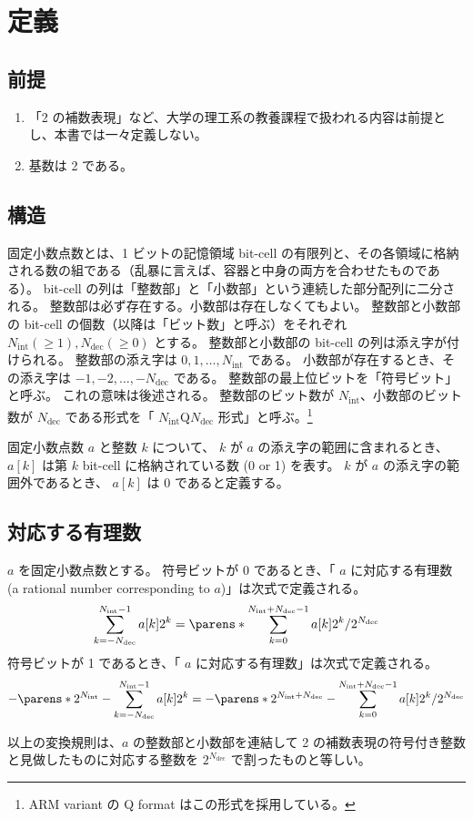\chapter{定義}
    \newcommand{\Ni}{{N_\text{int}}}
    \newcommand{\Nd}{{N_\text{dec}}}
    \section{前提}
        \label{fxd-pt_num::def::prem}
        \begin{enumerate}
            \item 「2 の補数表現」など、大学の理工系の教養課程で扱われる内容は前提とし、本書では一々定義しない。
            \item 基数は 2 である。
        \end{enumerate}
    \section{構造}
        固定小数点数とは、1 ビットの記憶領域 bit-cell の有限列と、その各領域に格納される数の組である（乱暴に言えば、容器と中身の両方を合わせたものである）。
        bit-cell の列は「整数部」と「小数部」という連続した部分配列に二分される。
        整数部は必ず存在する。小数部は存在しなくてもよい。
        整数部と小数部の bit-cell の個数（以降は「ビット数」と呼ぶ）をそれぞれ $\Ni(\geq 1), \Nd(\geq 0)$ とする。
        整数部と小数部の bit-cell の列は添え字が付けられる。
        整数部の添え字は $0,1,\dots,\Ni$ である。
        小数部が存在するとき、その添え字は $-1,-2,\dots,-\Nd$ である。
        整数部の最上位ビットを「符号ビット」と呼ぶ。
        これの意味は後述される。
        整数部のビット数が $\Ni$、小数部のビット数が $\Nd$ である形式を「 $\Ni$Q$\Nd$ 形式」と呼ぶ。\footnote{ARM variant の Q format はこの形式を採用している。}
        \par
        固定小数点数 $a$ と整数 $k$ について、 $k$ が $a$ の添え字の範囲に含まれるとき、$a[k]$ は第 $k$ bit-cell に格納されている数 (0 or 1) を表す。
        $k$ が $a$ の添え字の範囲外であるとき、 $a[k]$ は 0 であると定義する。
    \section{対応する有理数}
        $a$ を固定小数点数とする。
        符号ビットが 0 であるとき、「 $a$ に対応する有理数 (a rational number corresponding to $a$)」は次式で定義される。
        \[ \sum_{k=-\Nd}^{\Ni-1} a[k]2^k = \parens*{\sum_{k=0}^{\Ni+\Nd-1} a[k]2^k}/2^\Nd \]
        符号ビットが 1 であるとき、「 $a$ に対応する有理数」は次式で定義される。
        \[ -\parens*{2^\Ni - \sum_{k=-\Nd}^{\Ni-1} a[k]2^k} = -\parens*{2^{\Ni+\Nd} - \sum_{k=0}^{\Ni+\Nd-1} a[k]2^k}/2^\Nd \]
        \par
        以上の変換規則は、$a$ の整数部と小数部を連結して 2 の補数表現の符号付き整数と見做したものに対応する整数を $2^\Nd$ で割ったものと等しい。
